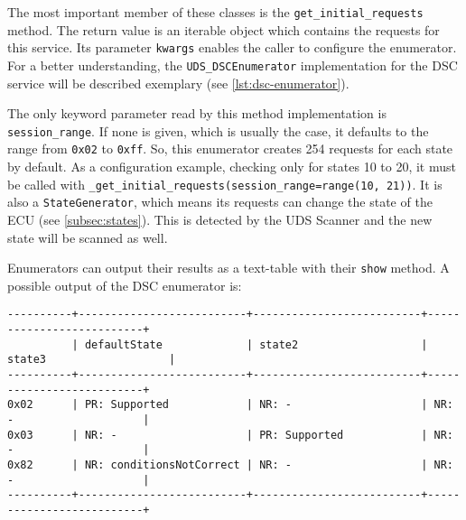 The most important member of these classes is the \texttt{get_initial_requests} method. The return value is an iterable object which contains the requests for this service. Its parameter \texttt{kwargs} enables the caller to configure the enumerator. For a better understanding, the \texttt{UDS_DSCEnumerator} implementation for the DSC service will be described exemplary (see \autoref{lst:dsc-enumerator}).


The only keyword parameter read by this method implementation is \texttt{session_range}. If none is given, which is usually the case, it defaults to the range from \texttt{0x02} to \texttt{0xff}. So, this enumerator creates 254 requests for each state by default. As a configuration example, checking only for states 10 to 20, it must be called with \texttt{_get_initial_requests(session_range=range(10, 21))}. It is also a \texttt{StateGenerator}, which means its requests can change the state of the ECU (see \autoref{subsec:states}). This is detected by the UDS Scanner and the new state will be scanned as well.

Enumerators can output their results as a text-table with their \texttt{show} method. A possible output of the DSC enumerator is:

\begin{samepage}
\begin{verbatim}
----------+--------------------------+--------------------------+--------------------------+
          | defaultState             | state2                   | state3                   | 
----------+--------------------------+--------------------------+--------------------------+
0x02      | PR: Supported            | NR: -                    | NR: -                    | 
0x03      | NR: -                    | PR: Supported            | NR: -                    | 
0x82      | NR: conditionsNotCorrect | NR: -                    | NR: -                    | 
----------+--------------------------+--------------------------+--------------------------+
\end{verbatim}
\end{samepage}

